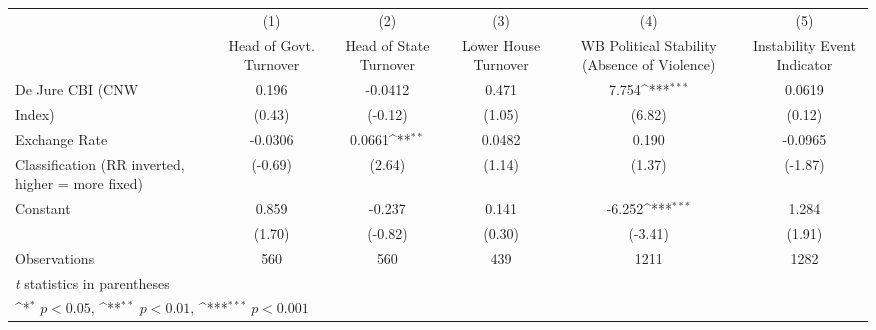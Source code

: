 {
\def\sym#1{\ifmmode^{#1}\else\(^{#1}\)\fi}
\begin{tabular}{l*{5}{c}}
\toprule
                &\multicolumn{1}{c}{(1)}&\multicolumn{1}{c}{(2)}&\multicolumn{1}{c}{(3)}&\multicolumn{1}{c}{(4)}&\multicolumn{1}{c}{(5)}\\
                &\multicolumn{1}{c}{Head of Govt. Turnover}&\multicolumn{1}{c}{Head of State Turnover}&\multicolumn{1}{c}{Lower House Turnover}&\multicolumn{1}{c}{WB Political Stability (Absence of Violence)}&\multicolumn{1}{c}{Instability Event Indicator}\\
\midrule
De Jure CBI (CNW&    0.196         &  -0.0412         &    0.471         &    7.754\sym{***}&   0.0619         \\
Index)          &   (0.43)         &  (-0.12)         &   (1.05)         &   (6.82)         &   (0.12)         \\
\addlinespace
Exchange Rate   &  -0.0306         &   0.0661\sym{**} &   0.0482         &    0.190         &  -0.0965         \\
Classification (RR inverted, higher = more fixed)&  (-0.69)         &   (2.64)         &   (1.14)         &   (1.37)         &  (-1.87)         \\
\addlinespace
Constant        &    0.859         &   -0.237         &    0.141         &   -6.252\sym{***}&    1.284         \\
                &   (1.70)         &  (-0.82)         &   (0.30)         &  (-3.41)         &   (1.91)         \\
\midrule
Observations    &      560         &      560         &      439         &     1211         &     1282         \\
\bottomrule
\multicolumn{6}{l}{\footnotesize \textit{t} statistics in parentheses}\\
\multicolumn{6}{l}{\footnotesize \sym{*} \(p<0.05\), \sym{**} \(p<0.01\), \sym{***} \(p<0.001\)}\\
\end{tabular}
}
